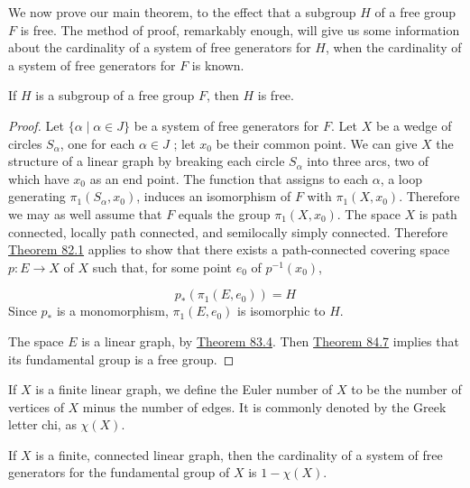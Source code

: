 We now prove our main theorem, to the effect that a subgroup \(H\) of a free group \(F\) is free. The method of proof, remarkably enough, will give us some information about the cardinality of a system of free generators for \(H\), when the cardinality of a system of free generators for \(F\) is known.

\begin{theorem}
\label{thm:\thetheorem}
	If \(H\) is a subgroup of a free group \(F\), then \(H\) is free.
\end{theorem}

\begin{proof}
	Let \(\{ \alpha \mid \alpha \in J\}\) be a system of free generators for \(F\). Let \(X\) be a wedge of circles \(S_{\alpha }\), one for each \(\alpha \in J\) ; let \(x_{0}\) be their common point. We can give \(X\) the structure of a linear graph by breaking each circle \(S_{\alpha }\) into three arcs, two of which have \(x_{0}\) as an end point. The function that assigns to each \(\alpha\), a loop generating \({\pi }_{1}( {S_{\alpha },x_{0}})\), induces an isomorphism of \(F\) with \({\pi }_{1}( {X,x_{0}})\). Therefore we may as well assume that \(F\) equals the group \({\pi }_{1}( {X,x_{0}})\).
The space \(X\) is path connected, locally path connected, and semilocally simply connected. Therefore \hyperref[thm:82.1]{Theorem 82.1} applies to show that there exists a path-connected covering space \(p : E \rightarrow X\) of \(X\) such that, for some point \(e_{0}\) of \(p^{-1}( x_{0})\),

\[
p_{ * }( {{\pi }_{1}( {E,e_{0}}) }) = H
\]
Since \(p_{ * }\) is a monomorphism, \({\pi }_{1}( {E,e_{0}})\) is isomorphic to \(H\).

The space \(E\) is a linear graph, by \hyperref[thm:83.4]{Theorem 83.4}. Then \hyperref[thm:84.7]{Theorem 84.7} implies that its fundamental group is a free group.
\end{proof}
\begin{definition}
	If \(X\) is a finite linear graph, we define the Euler number of \(X\) to be the number of vertices of \(X\) minus the number of edges. It is commonly denoted by the Greek letter chi, as \(\chi ( X)\).
\end{definition}

\begin{lemma}
\label{lem:\thetheorem}
	If \(X\) is a finite, connected linear graph, then the cardinality of a system of free generators for the fundamental group of \(X\) is \(1 - \chi ( X)\).
\end{lemma}

